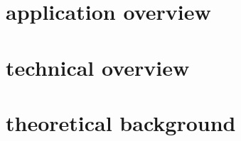 %
%

\part{\theApplicationName{} application overview}

\clearpage


\clearpage


\clearpage

%

%

\part{\theApplicationName{} technical overview}

\clearpage

%


\clearpage


\clearpage


\clearpage

%

\part{\theApplicationName{} theoretical background}


\clearpage

%


\clearpage


\clearpage


\clearpage
